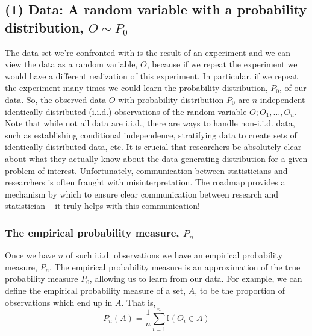 \documentclass[12pt, krantz2,]{krantz}
\theoremstyle{definition}
\theoremstyle{definition}
\theoremstyle{definition}
\newcommand{\I}{\mathbb{I}}
\newcommand{\1}{\mathbbm{1}}
\begin{document}
\hypertarget{data-a-random-variable-with-a-probability-distribution-o-sim-p_0}{%
\subsection*{\texorpdfstring{(1) Data: A random variable with a probability distribution, \(O \sim P_0\)}{(1) Data: A random variable with a probability distribution, O \textbackslash{}sim P\_0}}\label{data-a-random-variable-with-a-probability-distribution-o-sim-p_0}}


The data set we're confronted with is the result of an experiment and we can
view the data as a random variable, \(O\), because if we repeat the experiment
we would have a different realization of this experiment. In particular, if we
repeat the experiment many times we could learn the probability distribution,
\(P_0\), of our data. So, the observed data \(O\) with probability distribution
\(P_0\) are \(n\) independent identically distributed (i.i.d.) observations of the
random variable \(O; O_1, \ldots, O_n\). Note that while not all data are i.i.d.,
there are ways to handle non-i.i.d. data, such as establishing conditional
independence, stratifying data to create sets of identically distributed data,
etc. It is crucial that researchers be absolutely clear about what they actually
know about the data-generating distribution for a given problem of interest.
Unfortunately, communication between statisticians and researchers is often
fraught with misinterpretation. The roadmap provides a mechanism by which to
ensure clear communication between research and statistician -- it truly helps
with this communication!

\hypertarget{the-empirical-probability-measure-p_n}{%
\subsubsection*{\texorpdfstring{The empirical probability measure, \(P_n\)}{The empirical probability measure, P\_n}}\label{the-empirical-probability-measure-p_n}}


Once we have \(n\) of such i.i.d. observations we have an empirical probability
measure, \(P_n\). The empirical probability measure is an approximation of the
true probability measure \(P_0\), allowing us to learn from our data. For
example, we can define the empirical probability measure of a set, \(A\), to be
the proportion of observations which end up in \(A\). That is,
\begin{equation*}
  P_n(A) = \frac{1}{n}\sum_{i=1}^{n} \I(O_i \in A)
\end{equation*}
\end{document}
